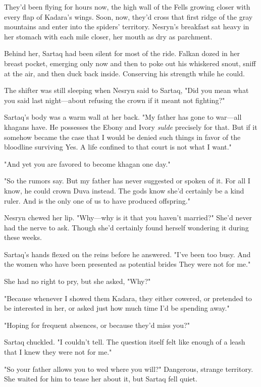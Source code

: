 They'd been flying for hours now, the high wall of the Fells growing closer with every flap of Kadara's wings. Soon, now, they'd cross that first ridge of the gray mountains and enter into the spiders' territory. Nesryn's breakfast sat heavy in her stomach with each mile closer, her mouth as dry as parchment.

Behind her, Sartaq had been silent for most of the ride. Falkan dozed in her breast pocket, emerging only now and then to poke out his whiskered snout, sniff at the air, and then duck back inside. Conserving his strength while he could.

The shifter was still sleeping when Nesryn said to Sartaq, "Did you mean what you said last night---about refusing the crown if it meant not fighting?"

Sartaq's body was a warm wall at her back. "My father has gone to war---all khagans have. He possesses the Ebony and Ivory \emph{sulde}
precisely for that. But if it somehow became the case that I would be denied such things in favor of the bloodline surviving  Yes. A life confined to that court is not what I want."

"And yet you are favored to become khagan one day."

"So the rumors say. But my father has never suggested or spoken of it. For all I know, he could crown Duva instead. The gods know she'd certainly be a kind ruler. And is the only one of us to have produced offspring."

Nesryn chewed her lip. "Why---why is it that you haven't married?" She'd never had the nerve to ask. Though she'd certainly found herself wondering it during these weeks.

Sartaq's hands flexed on the reins before he answered. "I've been too busy. And the women who have been presented as potential brides 
They were not for me."

She had no right to pry, but she asked, "Why?"

"Because whenever I showed them Kadara, they either cowered, or pretended to be interested in her, or asked just how much time I'd be spending away."

"Hoping for frequent absences, or because they'd miss you?"

Sartaq chuckled. "I couldn't tell. The question itself felt like enough of a leash that I knew they were not for me."

"So your father allows you to wed where you will?" Dangerous, strange territory. She waited for him to tease her about it, but Sartaq fell quiet.

